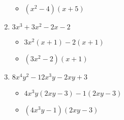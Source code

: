 \documentclass{article}
\begin{document}
\begin{enumerate}
\begin{itemize}
  \item $(x^{2}-4)(x+5)$
  \end{itemize}
\item $3x^{3} + 3x^{2} - 2x - 2$
  \begin{itemize}
  \item $3x^{2}(x+1)-2(x+1)$
  \item $(3x^{2}-2)(x+1)$
  \end{itemize}
\item $8x^{4}y^{2} - 12x^{3}y - 2xy + 3$
  \begin{itemize}
  \item $4x^{3}y(2xy-3)-1(2xy-3)$
  \item $(4x^{3}y-1)(2xy-3)$
  \end{itemize}
\end{enumerate}
\end{document}
